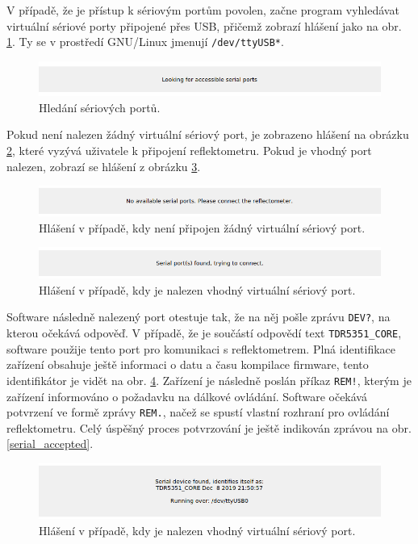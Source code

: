 V případě, že je přístup k sériovým portům povolen, začne program vyhledávat virtuální sériové porty připojené přes USB, přičemž zobrazí hlášení jako na obr. \ref{serial_port_lookup}. Ty se v prostředí GNU/Linux jmenují \verb"/dev/ttyUSB*". 
\begin{figure}[H]
\includegraphics[width=\textwidth,keepaspectratio]{images/gui/serial_port_lookup_cut.png}\caption{Hledání sériových portů.}\label{serial_port_lookup}
\end{figure}

Pokud není nalezen žádný virtuální sériový port, je zobrazeno hlášení na obrázku \ref{serial_no_port_available}, které vyzývá uživatele k připojení reflektometru. Pokud je vhodný port nalezen, zobrazí se hlášení z obrázku \ref{serial_port_found}.
\begin{figure}[H]
\includegraphics[width=\textwidth,keepaspectratio]{images/gui/serial_no_port_available_cut.png}\caption{Hlášení v případě, kdy není připojen žádný virtuální sériový port.}\label{serial_no_port_available}
\end{figure}

\begin{figure}[H]
\includegraphics[width=\textwidth,keepaspectratio]{images/gui/serial_port_found_cut.png}\caption{Hlášení v případě, kdy je nalezen vhodný virtuální sériový port.}\label{serial_port_found}
\end{figure}

Software následně nalezený port otestuje tak, že na něj pošle zprávu \verb"DEV?", na kterou očekává odpověď. V případě, že je součástí odpovědí text \verb"TDR5351_CORE", software použije tento port pro komunikaci s reflektometrem. Plná identifikace zařízení obsahuje ještě informaci o datu a času kompilace firmware, tento identifikátor je vidět na obr. \ref{serial_device_found}. Zařízení je následně poslán příkaz \verb"REM!", kterým je zařízení informováno o požadavku na dálkové ovládání. Software očekává potvrzení ve formě zprávy \verb"REM.", načež se spustí vlastní rozhraní pro ovládání reflektometru. Celý úspěšný proces potvrzování je ještě indikován zprávou na obr. \ref{serial_accepted}.
\begin{figure}[H]
\includegraphics[width=\textwidth,keepaspectratio]{images/gui/serial_device_found_cut.png}\caption{Hlášení v případě, kdy je nalezen vhodný virtuální sériový port.}\label{serial_device_found}
\end{figure}

